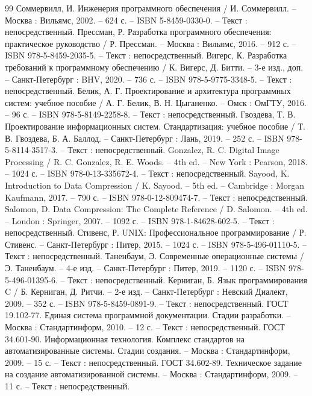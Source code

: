 \begin{thebibliography}{99}
	 Соммервилл, И. Инженерия программного обеспечения / И. Соммервилл. – Москва : Вильямс, 2002. – 624 с. – ISBN 5-8459-0330-0. – Текст : непосредственный.
	 Прессман, Р. Разработка программного обеспечения: практическое руководство / Р. Прессман. – Москва : Вильямс, 2016. – 912 с. – ISBN 978-5-8459-2035-5. – Текст : непосредственный.
	 Вигерс, К. Разработка требований к программному обеспечению / К. Вигерс, Д. Битти. – 3-е изд., доп. – Санкт-Петербург : BHV, 2020. – 736 с. – ISBN 978-5-9775-3348-5. – Текст : непосредственный.
	 Белик, А. Г. Проектирование и архитектура программных систем: учебное пособие / А. Г. Белик, В. Н. Цыганенко. – Омск : ОмГТУ, 2016. – 96 с. – ISBN 978-5-8149-2258-8. – Текст : непосредственный.
	 Гвоздева, Т. В. Проектирование информационных систем. Стандартизация: учебное пособие / Т. В. Гвоздева, Б. А. Баллод. – Санкт-Петербург : Лань, 2019. – 252 с. – ISBN 978-5-8114-3517-3. – Текст : непосредственный.
	 Gonzalez, R. C. Digital Image Processing / R. C. Gonzalez, R. E. Woods. – 4th ed. – New York : Pearson, 2018. – 1024 с. – ISBN 978-0-13-335672-4. – Текст : непосредственный.
	 Sayood, K. Introduction to Data Compression / K. Sayood. – 5th ed. – Cambridge : Morgan Kaufmann, 2017. – 790 с. – ISBN 978-0-12-809474-7. – Текст : непосредственный.
	 Salomon, D. Data Compression: The Complete Reference / D. Salomon. – 4th ed. – London : Springer, 2007. – 1092 с. – ISBN 978-1-84628-602-5. – Текст : непосредственный.
	 Стивенс, Р. UNIX: Профессиональное программирование / Р. Стивенс. – Санкт-Петербург : Питер, 2015. – 1024 с. – ISBN 978-5-496-01110-5. – Текст : непосредственный.
	 Таненбаум, Э. Современные операционные системы / Э. Таненбаум. – 4-е изд. – Санкт-Петербург : Питер, 2019. – 1120 с. – ISBN 978-5-496-01395-6. – Текст : непосредственный.
	 Керниган, Б. Язык программирования C / Б. Керниган, Д. Ритчи. – 2-е изд. – Санкт-Петербург : Невский Диалект, 2009. – 352 с. – ISBN 978-5-8459-0891-9. – Текст : непосредственный.
	 ГОСТ 19.102-77. Единая система программной документации. Стадии разработки. – Москва : Стандартинформ, 2010. – 12 с. – Текст : непосредственный.
	 ГОСТ 34.601-90. Информационная технология. Комплекс стандартов на автоматизированные системы. Стадии создания. – Москва : Стандартинформ, 2009. – 15 с. – Текст : непосредственный.
	 ГОСТ 34.602-89. Техническое задание на создание автоматизированной системы. – Москва : Стандартинформ, 2009. – 11 с. – Текст : непосредственный.

\end{thebibliography}

